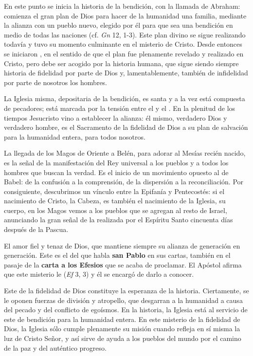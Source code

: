 {En este punto se inicia la historia de la bendición, con la llamada de Abraham: comienza el gran plan de Dios para hacer de la humanidad una familia, mediante la alianza con un pueblo nuevo, elegido por él para que sea una bendición en medio de todas las naciones (cf. \emph{Gn} 12, 1-3). Este plan divino se sigue realizando todavía y tuvo su momento culminante en el misterio de Cristo. Desde entonces se iniciaron , en el sentido de que el plan fue plenamente revelado y realizado en Cristo, pero debe ser acogido por la historia humana, que sigue siendo siempre historia de fidelidad por parte de Dios y, lamentablemente, también de infidelidad por parte de nosotros los hombres.

La Iglesia misma, depositaria de la bendición, es santa y a la vez está compuesta de pecadores; está marcada por la tensión entre el  y el . En la plenitud de los tiempos Jesucristo vino a establecer la alianza: él mismo, verdadero Dios y verdadero hombre, es el Sacramento de la fidelidad de Dios a su plan de salvación para la humanidad entera, para todos nosotros.

La llegada de los Magos de Oriente a Belén, para adorar al Mesías recién nacido, es la señal de la manifestación del Rey universal a los pueblos y a todos los hombres que buscan la verdad. Es el inicio de un movimiento opuesto al de Babel: de la confusión a la comprensión, de la dispersión a la reconciliación. Por consiguiente, descubrimos un vínculo entre la Epifanía y Pentecostés: si el nacimiento de Cristo, la Cabeza, es también el nacimiento de la Iglesia, su cuerpo, en los Magos vemos a los pueblos que se agregan al resto de Israel, anunciando la gran señal de la  realizada por el Espíritu Santo cincuenta días después de la Pascua.

El amor fiel y tenaz de Dios, que mantiene siempre su alianza de generación en generación. Este es el  del que habla \textbf{san Pablo} en sus cartas, también en el pasaje de la \textbf{carta a los Efesios} que se acaba de proclamar. El Apóstol afirma que este misterio le  (\emph{Ef} 3, 3) y él se encargó de darlo a conocer.

Este  de la fidelidad de Dios constituye la esperanza de la historia. Ciertamente, se le oponen fuerzas de división y atropello, que desgarran a la humanidad a causa del pecado y del conflicto de egoísmos. En la historia, la Iglesia está al servicio de este  de bendición para la humanidad entera. En este misterio de la fidelidad de Dios, la Iglesia sólo cumple plenamente su misión cuando refleja en sí misma la luz de Cristo Señor, y así sirve de ayuda a los pueblos del mundo por el camino de la paz y del auténtico progreso.

}
